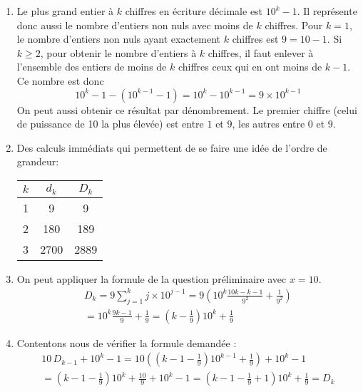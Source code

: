 \begin{enumerate}
 \item Le plus grand entier à $k$ chiffres en écriture décimale est $10^k -1$. Il représente donc aussi le nombre d'entiers non nuls avec moins de $k$ chiffres.   Pour $k=1$, le nombre d'entiers non nuls ayant exactement $k$ chiffres est $9=10-1$. Si $k\geq 2$, pour obtenir le nombre d'entiers à $k$ chiffres, il faut enlever à l'ensemble des entiers de moins de $k$ chiffres ceux qui en ont moins de $k-1$. Ce nombre est donc
\begin{displaymath}
 10^k-1-(10^{k-1}-1)=10^k - 10^{k-1}=9\times 10^{k-1}
\end{displaymath}
On peut aussi obtenir ce résultat par dénombrement. Le premier  chiffre (celui de puissance de 10 la plus élevée) est entre $1$ et $9$, les autres entre $0$ et $9$.
 \item Des calculs immédiats qui permettent de se faire une idée de l'ordre de grandeur:
\begin{center}
\renewcommand{\arraystretch}{1.4}
\begin{tabular}{|c|c|c|} \hline
$k$ & $d_k$ & $D_k$  \\ \hline
1   & 9     & 9    \\ \hline
2   & 180   & 189  \\ \hline
3   & 2700  & 2889 \\ \hline
\end{tabular}
\end{center}

 \item On peut appliquer la formule de la question préliminaire avec $x=10$.
\begin{multline*}
 D_k = 9\sum _{j=1}^kj\times10^{j-1}
=9\left( 10^k\frac{10k-k-1}{9^2}+\frac{1}{9^2}\right)\\
=10^k\frac{9k-1}{9}+\frac{1}{9}
=(k-\frac{1}{9})10^k+\frac{1}{9} 
\end{multline*}

 \item Contentons nous de vérifier la formule demandée :
\begin{multline*}
 10\,D_{k-1} + 10^k -1
=10\left( (k-1-\frac{1}{9})10^{k-1}+\frac{1}{9}\right) + 10^k -1\\
=(k-1-\frac{1}{9})10^{k}+\frac{10}{9}+ 10^k -1
= (k-1-\frac{1}{9}+1)10^{k}+\frac{1}{9} = D_k
\end{multline*}
\end{enumerate}

